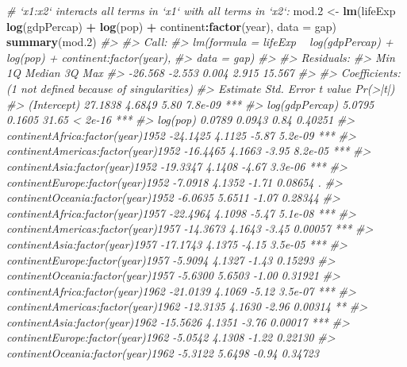 \documentclass[
]{book}
\newenvironment{Shaded}{\begin{snugshade}}{\end{snugshade}}
\newcommand{\CommentTok}[1]{\textcolor[rgb]{0.56,0.35,0.01}{\textit{#1}}}
\newcommand{\DataTypeTok}[1]{\textcolor[rgb]{0.13,0.29,0.53}{#1}}
\newcommand{\FloatTok}[1]{\textcolor[rgb]{0.00,0.00,0.81}{#1}}
\newcommand{\KeywordTok}[1]{\textcolor[rgb]{0.13,0.29,0.53}{\textbf{#1}}}
\newcommand{\NormalTok}[1]{#1}
\newcommand{\OperatorTok}[1]{\textcolor[rgb]{0.81,0.36,0.00}{\textbf{#1}}}
\newcommand{\StringTok}[1]{\textcolor[rgb]{0.31,0.60,0.02}{#1}}
\begin{document}
\begin{Shaded}
\begin{Highlighting}[]
\CommentTok{# `x1:x2` interacts all terms in `x1` with all terms in `x2`:}
\NormalTok{mod}\FloatTok{.2}\NormalTok{ <-}\StringTok{ }\KeywordTok{lm}\NormalTok{(lifeExp }\OperatorTok{~}\StringTok{ }\KeywordTok{log}\NormalTok{(gdpPercap) }\OperatorTok{+}\StringTok{ }\KeywordTok{log}\NormalTok{(pop) }\OperatorTok{+}\StringTok{ }\NormalTok{continent}\OperatorTok{:}\KeywordTok{factor}\NormalTok{(year), }
            \DataTypeTok{data =}\NormalTok{ gap)}
\KeywordTok{summary}\NormalTok{(mod}\FloatTok{.2}\NormalTok{)}
\CommentTok{#> }
\CommentTok{#> Call:}
\CommentTok{#> lm(formula = lifeExp ~ log(gdpPercap) + log(pop) + continent:factor(year), }
\CommentTok{#>     data = gap)}
\CommentTok{#> }
\CommentTok{#> Residuals:}
\CommentTok{#>     Min      1Q  Median      3Q     Max }
\CommentTok{#> -26.568  -2.553   0.004   2.915  15.567 }
\CommentTok{#> }
\CommentTok{#> Coefficients: (1 not defined because of singularities)}
\CommentTok{#>                                    Estimate Std. Error t value Pr(>|t|)    }
\CommentTok{#> (Intercept)                         27.1838     4.6849    5.80  7.8e-09 ***}
\CommentTok{#> log(gdpPercap)                       5.0795     0.1605   31.65  < 2e-16 ***}
\CommentTok{#> log(pop)                             0.0789     0.0943    0.84  0.40251    }
\CommentTok{#> continentAfrica:factor(year)1952   -24.1425     4.1125   -5.87  5.2e-09 ***}
\CommentTok{#> continentAmericas:factor(year)1952 -16.4465     4.1663   -3.95  8.2e-05 ***}
\CommentTok{#> continentAsia:factor(year)1952     -19.3347     4.1408   -4.67  3.3e-06 ***}
\CommentTok{#> continentEurope:factor(year)1952    -7.0918     4.1352   -1.71  0.08654 .  }
\CommentTok{#> continentOceania:factor(year)1952   -6.0635     5.6511   -1.07  0.28344    }
\CommentTok{#> continentAfrica:factor(year)1957   -22.4964     4.1098   -5.47  5.1e-08 ***}
\CommentTok{#> continentAmericas:factor(year)1957 -14.3673     4.1643   -3.45  0.00057 ***}
\CommentTok{#> continentAsia:factor(year)1957     -17.1743     4.1375   -4.15  3.5e-05 ***}
\CommentTok{#> continentEurope:factor(year)1957    -5.9094     4.1327   -1.43  0.15293    }
\CommentTok{#> continentOceania:factor(year)1957   -5.6300     5.6503   -1.00  0.31921    }
\CommentTok{#> continentAfrica:factor(year)1962   -21.0139     4.1069   -5.12  3.5e-07 ***}
\CommentTok{#> continentAmericas:factor(year)1962 -12.3135     4.1630   -2.96  0.00314 ** }
\CommentTok{#> continentAsia:factor(year)1962     -15.5626     4.1351   -3.76  0.00017 ***}
\CommentTok{#> continentEurope:factor(year)1962    -5.0542     4.1308   -1.22  0.22130    }
\CommentTok{#> continentOceania:factor(year)1962   -5.3122     5.6498   -0.94  0.34723    }

\end{Highlighting}
\end{Shaded}
\end{document}
